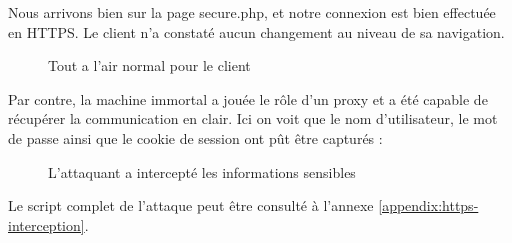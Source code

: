 Nous arrivons bien sur la page secure.php, et notre connexion est bien effectuée en HTTPS. Le client n'a constaté aucun changement au niveau de sa navigation.

\begin{figure}[H]
  \caption{Tout a l'air normal pour le client}
\end{figure}

Par contre, la machine immortal a jouée le rôle d'un proxy et a été capable de récupérer la communication en clair. Ici on voit que le nom d'utilisateur, le mot de passe ainsi que le cookie de session ont pût être capturés :

\begin{figure}[H]
  \caption{L'attaquant a intercepté les informations sensibles}
\end{figure}

Le script complet de l'attaque peut être consulté à l'annexe \ref{appendix:https-interception}.
